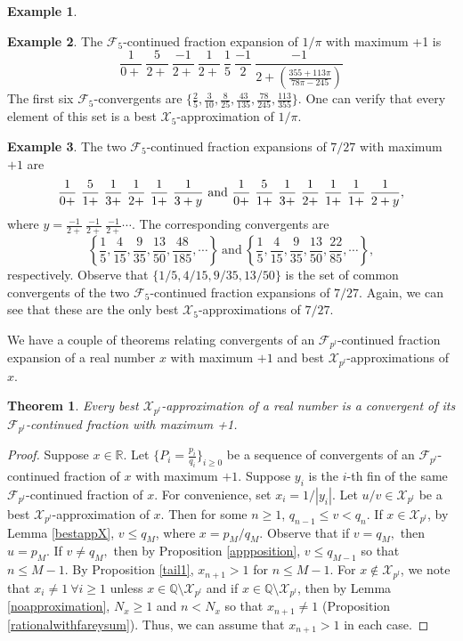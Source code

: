\documentclass[12pt]{elsarticle}
\newtheorem{theorem}{Theorem}[section]
\theoremstyle{definition}
\newtheorem{example}{Example}
\newcommand{\field}[1]{\mathbb{#1}}          \newcommand{\Q}{\field{Q}}
\newcommand{\R}{\field{R}}                   \newcommand{\Z}{\field{Z}}
\newcommand{\mX}{{\mathcal X}}
\newcommand{\f}{{\mathcal F}}
\begin{document}
{\begin{example}
  		\end{example}	
  		\begin{example}
  			The $\f_5$-continued fraction expansion of $1/\pi$ with maximum +1 is
  				$$\frac{1}{0+}~\frac{5}{2+}~\frac{-1}{2+}~\frac{1}{2+}~\frac{1}{5}~\frac{-1}{2}~\frac{-1}{2+(\frac{355+113\pi}{78\pi-245})}$$
  			The first six $\f_5$-convergents are
  			$\Big\{\frac{2}{5},\frac{3}{10}, \frac{8}{25}, \frac{43}{135}, \frac{78}{245}, \frac{113}{355} \Big\}.$
  			One can verify that every element of this set is a best $\mX_5$-approximation of $1/\pi$.
  		\end{example}	
  \begin{example}
  The two $\f_5$-continued fraction expansions of ${7}/{27}$ with maximum $+1$  are 
  	$$\frac{1}{0+}~\frac{5}{1+}~\frac{1}{3+}~\frac{1}{2+}~\frac{1}{1+}~\frac{1}{3+y}
  \textnormal{ and }
  	\frac{1}{0+}~\frac{5}{1+}~\frac{1}{3+}~\frac{1}{2+}~\frac{1}{1+}~\frac{1}{1+}~\frac{1}{2+y},$$
  	where $y=\frac{-1}{2+}~\frac{-1}{2+}~\frac{-1}{2+}\cdots.$
  	 The corresponding convergents are
  	\begin{equation*}
  	\left\{\frac{1}{5},\frac{4}{15},\frac{9}{35},\frac{13}{50},\frac{48}{185},\cdots\right\}~\mathrm{and}~
  	\left\{\frac{1}{5},\frac{4}{15},\frac{9}{35},\frac{13}{50},\frac{22}{85},\cdots\right\}, 
  	\end{equation*}
  	respectively. Observe that $\{1/5,4/15,9/35,13/50\}$ is 
  	the set of common convergents of the two $\f_{5}$-continued fraction expansions of $7/27$. Again, we can see that these are the only best $\mX_5$-approximations of $7/27$. 
  \end{example} 	
  	We have a couple of theorems relating convergents of an $\f_{p^l}$-continued fraction expansion of a real number $x$ with maximum $+1$ and best 	$\mX_{p^l}$-approximations of $x$.
  		
  	
  		\begin{theorem}
  			Every best $\mX_{p^l}$-approximation of a real number is a convergent of its $\f_{p^l}$-continued fraction with maximum +1.
  		\end{theorem}
  		\begin{proof} 
  		Suppose $x\in\R.$	Let $\{P_i=\frac{p_i}{q_i}\}_{i\ge0}$ be a sequence of convergents of an $\f_{p^l}$-continued fraction of $x$ with maximum $+1$. Suppose $y_i$ is the $i$-th fin of the same $\f_{p^l}$-continued fraction of $x$. For convenience, set $x_i=1/|y_i|$.
  			Let $u/v\in\mX_{p^l}$ be a best $\mX_{p^l}$-approximation of $x$. Then for some $n \geq 1$,
  			$q_{n-1} \le v< q_{n}.$ If $x\in\mX_{p^l}$, by Lemma \ref{bestappX}, $v\le q_M$, where $x=p_M/q_M$. Observe that if $v=q_M,$ then $u=p_M$. If $v\ne q_M,$ then by Proposition \ref{appposition}, $v\le q_{M-1}$ so that $n\le M-1$. By Proposition \ref{tail1}, $x_{n+1}>1$ for $n\le M-1$. 
  			For $x\notin \mX_{p^l}$, we note that $x_i\ne1~\forall i\ge1$ unless $x\in\Q\setminus\mX_{p^l}$ and if $x\in\Q\setminus\mX_{p^l}$, then by Lemma \ref{noapproximation}, $N_x \geq 1$ and $n<N_x$ so that $x_{n+1}\ne1$ (Proposition \ref{rationalwithfareysum}). Thus, we can assume that $x_{n+1}>1$ in each case.
  			

\end{proof}}
\end{document}
